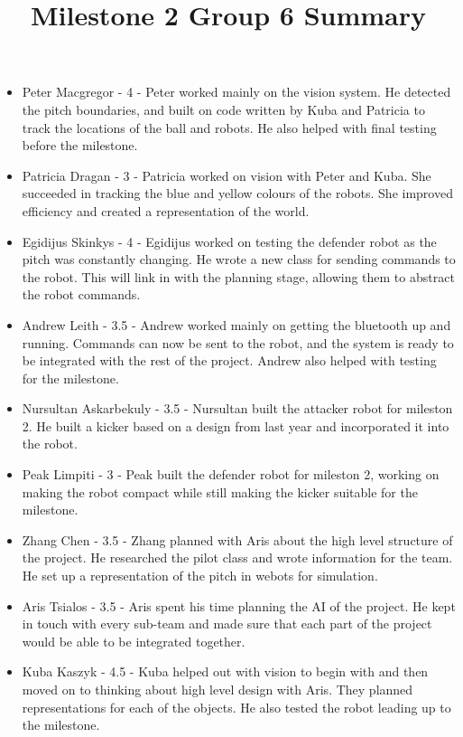 \documentclass[dvips]{article}
\begin{document}
\sloppy

\title{Milestone 2 Group 6 Summary}
 
\maketitle
\begin{itemize}
\item Peter Macgregor - 4 - Peter worked mainly on the vision system. He detected the pitch boundaries, and built on code written by Kuba and Patricia to track the locations of the ball and robots. He also helped with final testing before the milestone.
\item Patricia Dragan - 3 - Patricia worked on vision with Peter and Kuba. She succeeded in tracking the blue and yellow colours of the robots. She improved efficiency and created a representation of the world. 
\item Egidijus Skinkys - 4 - Egidijus worked on testing the defender robot as the pitch was constantly changing. He wrote a new class for sending commands to the robot. This will link in with the planning stage, allowing them to abstract the robot commands.
\item Andrew Leith - 3.5 - Andrew worked mainly on getting the bluetooth up and running. Commands can now be sent to the robot, and the system is ready to be integrated with the rest of the project. Andrew also helped with testing for the milestone.
\item Nursultan Askarbekuly - 3.5 - Nursultan built the attacker robot for mileston 2. He built a kicker based on a design from last year and incorporated it into the robot.
\item Peak Limpiti - 3 - Peak built the defender robot for mileston 2, working on making the robot compact while still making the kicker suitable for the milestone.
\item Zhang Chen - 3.5 - Zhang planned with Aris about the high level structure of the project. He researched the pilot class and wrote information for the team. He set up a representation of the pitch in webots for simulation.
\item Aris Tsialos - 3.5 - Aris spent his time planning the AI of the project. He kept in touch with every sub-team and made sure that each part of the project would be able to be integrated together.
\item Kuba Kaszyk - 4.5 - Kuba helped out with vision to begin with and then moved on to thinking about high level design with Aris. They planned representations for each of the objects. He also tested the robot leading up to the milestone.
\end{itemize}
\end{document}

